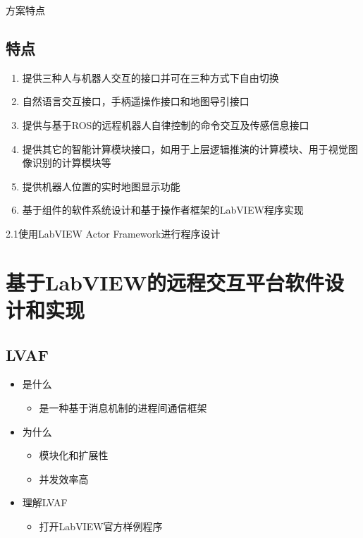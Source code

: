 \documentclass{beamer}
\begin{document}
\begin{frame}[t]{方案特点}
    \subsection{特点}
    \begin{enumerate}
        \item 提供三种人与机器人交互的接口并可在三种方式下自由切换
        \item 自然语言交互接口，手柄遥操作接口和地图导引接口
        \item 提供与基于ROS的远程机器人自律控制的命令交互及传感信息接口
        \item 提供其它的智能计算模块接口，如用于上层逻辑推演的计算模块、用于视觉图像识别的计算模块等
        \item 提供机器人位置的实时地图显示功能
        \item 基于组件的软件系统设计和基于操作者框架的LabVIEW程序实现
    \end{enumerate}
\end{frame}
\begin{frame}[t]{2.1使用LabVIEW Actor Framework进行程序设计}
    \section{基于LabVIEW的远程交互平台软件设计和实现}
    \subsection{LVAF}
    \begin{itemize}
        \item 是什么
            \begin{itemize}
                \item 是一种基于消息机制的进程间通信框架
            \end{itemize}
        \item 为什么
            \begin{itemize}
                \item 模块化和扩展性
                \item 并发效率高
            \end{itemize}
        \item 理解LVAF
            \begin{itemize}
                \item 打开LabVIEW官方样例程序
            \end{itemize}
    \end{itemize}
\end{frame}
\end{document}
